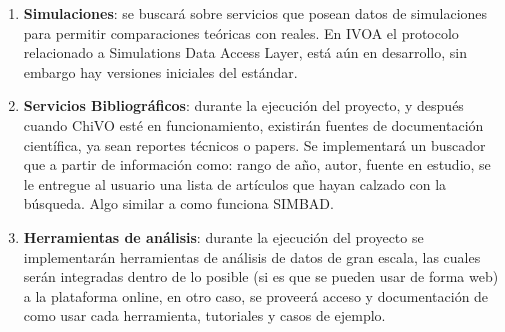 \begin{enumerate}
	\item \textbf{Simulaciones}: se buscará sobre servicios que posean
datos de simulaciones para permitir comparaciones teóricas con reales. En IVOA
el protocolo relacionado a Simulations Data Access Layer, está aún en
desarrollo, sin embargo hay versiones iniciales del estándar.

	\item \textbf{Servicios Bibliográficos}: durante la ejecución del
proyecto, y después cuando ChiVO esté en funcionamiento, existirán fuentes de
documentación científica, ya sean reportes técnicos o papers. Se implementará
un buscador que a partir de información como: rango de año, autor, fuente en
estudio, se le entregue al usuario una lista de artículos que hayan calzado con
la búsqueda.  Algo similar a como funciona SIMBAD.

	\item \textbf{Herramientas de análisis}: durante la ejecución del
proyecto se implementarán herramientas de análisis de datos de gran escala, las
cuales serán integradas dentro de lo posible (si es que se pueden usar de forma
web) a la plataforma online, en otro caso, se proveerá acceso y documentación
de como usar cada herramienta, tutoriales y casos de ejemplo.
\end{enumerate}
